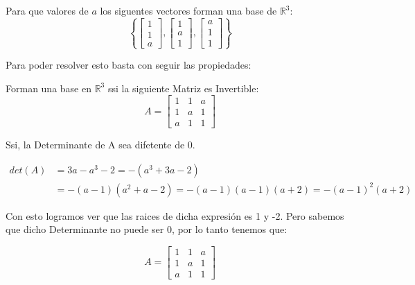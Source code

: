 \documentclass[12pt]{report}							    %
\begin{document}
            Para que valores de $a$ los siguentes vectores forman una base de $\mathbb{R}^3$:
            \begin{equation*}
                \left\{
                    \begin{bmatrix} 1 \\ 1 \\ a \end{bmatrix},
                    \begin{bmatrix} 1 \\ a \\ 1 \end{bmatrix},
                    \begin{bmatrix} a \\ 1 \\ 1 \end{bmatrix} 
                \right\}
            \end{equation*}


            Para poder resolver esto basta con seguir las propiedades:

            Forman una base en $\mathbb{R}^3$ ssi la siguiente Matriz es Invertible:
            \begin{equation*}
                A = \begin{bmatrix} 1 & 1 & a \\ 1 & a & 1 \\ a & 1 & 1 \end{bmatrix}
            \end{equation*}

            Ssi, la Determinante de A sea difetente de 0.

            \begin{equation*}
            \begin{split}
            det(A) & = 3a-a^3-2 = -(a^3+3a-2) \\
                   & = - (a-1)(a^2+a-2) = -(a-1)(a-1)(a+2) = -(a-1)^2(a+2)
            \end{split}
            \end{equation*}

            Con esto logramos ver que las raices de dicha expresión es 1 y -2.
            Pero sabemos que dicho Determinante no puede ser 0, por lo tanto tenemos que:

            \begin{equation*}
                A = \begin{bmatrix} 1 & 1 & a \\ 1 & a & 1 \\ a & 1 & 1 \end{bmatrix}
            \end{equation*}
\end{document}
